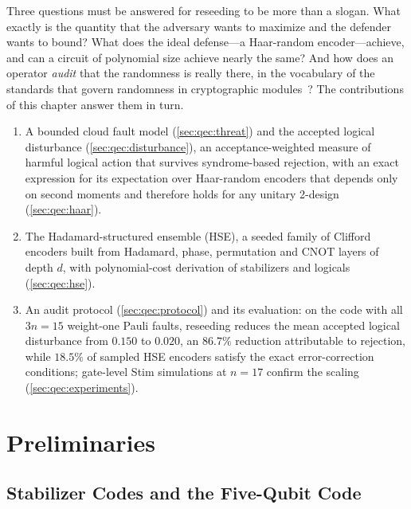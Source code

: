 Three questions must be answered for reseeding to be more than a slogan. What exactly is the quantity that the adversary wants to maximize and the defender wants to bound? What does the ideal defense---a Haar-random encoder---achieve, and can a circuit of polynomial size achieve nearly the same? And how does an operator \emph{audit} that the randomness is really there, in the vocabulary of the standards that govern randomness in cryptographic modules~\cite{nist2015sp80090a,nist2019fips1403}? The contributions of this chapter answer them in turn.
\begin{enumerate}
  \item A bounded cloud fault model (\cref{sec:qec:threat}) and the accepted logical disturbance (\cref{sec:qec:disturbance}), an acceptance-weighted measure of harmful logical action that survives syndrome-based rejection, with an exact expression for its expectation over Haar-random encoders that depends only on second moments and therefore holds for any unitary 2-design (\cref{sec:qec:haar}).
  \item The Hadamard-structured ensemble (HSE), a seeded family of Clifford encoders built from Hadamard, phase, permutation and CNOT layers of depth $d$, with polynomial-cost derivation of stabilizers and logicals (\cref{sec:qec:hse}).
  \item An audit protocol (\cref{sec:qec:protocol}) and its evaluation: on the  code with all $3n=15$ weight-one Pauli faults, reseeding reduces the mean accepted logical disturbance from $0.150$ to $0.020$, an $86.7\%$ reduction attributable to rejection, while $18.5\%$ of sampled HSE encoders satisfy the exact error-correction conditions; gate-level Stim simulations at $n=17$ confirm the scaling (\cref{sec:qec:experiments}).
\end{enumerate}

\section{Preliminaries}\label{sec:qec:prelim}

\subsection{Stabilizer Codes and the Five-Qubit Code}\label{sec:qec:stabilizer}

